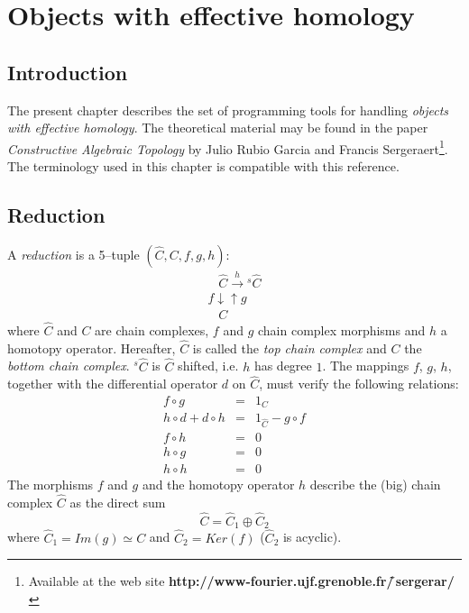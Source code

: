 \chapter {Objects with effective homology}

\section {Introduction}

The present chapter describes the set of programming tools for handling
{\em objects with effective homology}. The theoretical material may be
found in the paper {\em Constructive Algebraic Topology} by
Julio Rubio Garcia and Francis Sergeraert\footnote{Available at the web site
{\bf http://www-fourier.ujf.grenoble.fr/\~\,sergerar/}}.
The terminology used in this
chapter is compatible with this reference.

\section {Reduction}

A {\em reduction} is a 5--tuple $(\hat C, C, f, g, h)$:
$$
\begin{array}{l}
\hspace{10pt} \hat{C} \stackrel{h}{\longrightarrow}\mbox{$^s\hat{C}$} \\
{\scriptstyle f} \downarrow \uparrow {\scriptstyle g}\\
\hspace{10pt} C
\end{array}
$$
where $\hat C$ and $C$ are chain complexes, $f$ and $g$  chain complex morphisms and
$h$ a homotopy operator. Hereafter, $\hat C$ is called the {\em top chain complex}
and $C$ the {\em bottom chain complex}.
${}^s\hat C$ is $\hat C$ shifted, i.e. $h$ has
degree $1$. The mappings $f$, $g$, $h$, together with the differential operator $d$
on $\hat C$, must verify the following relations:
\newpage
\begin{eqnarray*}
f \circ g & = & 1_C \\
h \circ d + d \circ h & = & 1_{\hat C} - g \circ f \\
f \circ h & = & 0   \\
h \circ g & = & 0   \\
h \circ h & = & 0
\end{eqnarray*}
The morphisms $f$ and $g$ and the homotopy operator $h$ describe the (big) chain
complex $\hat C$ as the direct sum
$$ \hat C= \hat C_1 \oplus \hat C_2$$
where $\hat C_1 = Im(g) \simeq C$ and  $\hat C_2= Ker(f)$ ($\hat C_2$ is acyclic).

